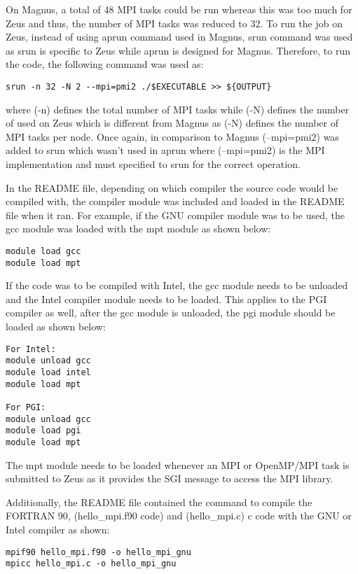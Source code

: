 \documentclass[journal]{IEEEtran}
\begin{document}
On Magnus, a total of 48 MPI tasks could be run whereas this was too much for Zeus and thus, the number of MPI tasks was reduced to 32. To run the job
on Zeus, instead of using aprun command used in Magnus, srun command was used as srun is specific to Zeus while aprun is designed for Magnus. Therefore,
to run the code, the following command was used as:

\begin{verbatim}
srun -n 32 -N 2 --mpi=pmi2 ./$EXECUTABLE >> ${OUTPUT}
\end{verbatim}

where (-n) defines the total number of MPI tasks while (-N) defines the number of used on Zeus which is different from Magnus as (-N) defines the number of
MPI tasks per node. Once again, in comparison to Magnus (--mpi=pmi2) was added to srun which wasn't used in aprun where (--mpi=pmi2) is the MPI
implementation and must specified to srun for the correct operation.

In the README file, depending on which compiler the source code would be compiled with, the compiler module was included and loaded in the README file 
when it ran. For example, if the GNU compiler module was to be used, the gcc module was loaded with the mpt module as shown below:

\begin{verbatim}
module load gcc
module load mpt
\end{verbatim}

If the code was to be compiled with Intel, the gcc module needs to be unloaded and the Intel compiler module needs to be loaded. This applies to the PGI
compiler as well, after the gcc module is unloaded, the pgi module should be loaded as shown below:

\begin{verbatim}
For Intel:
module unload gcc
module load intel
module load mpt

For PGI:
module unload gcc
module load pgi
module load mpt
\end{verbatim}

The mpt module needs to be loaded whenever an MPI or OpenMP/MPI task is submitted to Zeus as it provides the SGI message to access the MPI library.

Additionally, the README file contained the command to compile the FORTRAN 90, (hello_mpi.f90 code) and (hello_mpi.c) c code with the GNU or Intel compiler 
as shown:

\begin{verbatim}
mpif90 hello_mpi.f90 -o hello_mpi_gnu
mpicc hello_mpi.c -o hello_mpi_gnu
\end{verbatim}
\end{document}
